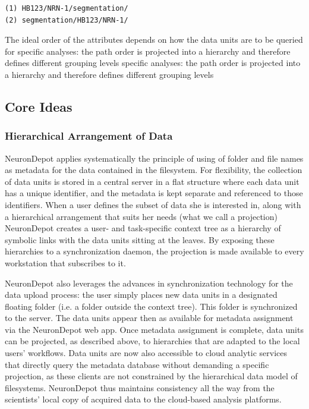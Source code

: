 \documentclass{frontiersSCNS} %
\begin{document}
\begin{lstlisting}[style=display]
(1) HB123/NRN-1/segmentation/
(2) segmentation/HB123/NRN-1/
\end{lstlisting}


The ideal order of the attributes depends on how the data units are to be
queried for specific analyses: the path order is projected into a hierarchy and
therefore defines different grouping levels specific analyses: the path order
is projected into a hierarchy and therefore defines different grouping levels

\subsection{Core Ideas}
\subsubsection{Hierarchical Arrangement of Data}

NeuronDepot applies systematically the principle of using of folder and file
names as metadata for the data contained in the filesystem. For flexibility,
the collection of data units is stored in a central server in a flat structure
where each data unit has a unique identifier, and the metadata is kept separate
and referenced to those identifiers. When a user defines the subset of data she
is interested in, along with a hierarchical arrangement that suits her needs
(what we call a projection) NeuronDepot creates a user- and task-specific
context tree as a hierarchy of symbolic links with the data units sitting at
the leaves. By exposing these hierarchies to a synchronization daemon, the
projection is made available to every workstation that subscribes to it.



NeuronDepot also leverages the advances in synchronization technology for the
data upload process: the user simply places new data units in a designated
floating folder (i.e. a folder outside the context tree). This folder is
synchronized to the server. The data units appear then as available for
metadata assignment via the NeuronDepot web app. Once metadata assignment is
complete, data units can be projected, as described above, to hierarchies that
are adapted to the local users' workflows. Data units are now also accessible
to cloud analytic services that directly query the metadata database without
demanding a specific projection, as these clients are not constrained by the
hierarchical data model of filesystems. NeuronDepot thus maintains consistency
all the way from the scientists' local copy of acquired data to the cloud-based
analysis platforms.
\end{document}
